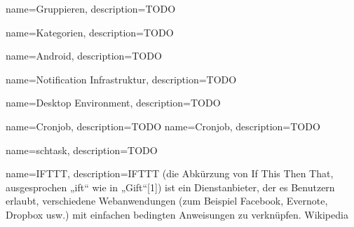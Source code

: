 {
  name=Gruppieren,
  description={TODO}
} 

{
  name=Kategorien,
  description={TODO }
} 

{
  name=Android,
  description={TODO}
} 

{
  name=Notification Infrastruktur,
  description={TODO}
} 

{
  name=Desktop Environment,
  description={TODO}
} 

{
  name=Cronjob,
  description={TODO}
} 
{
  name=Cronjob,
  description={TODO}
} 

{
  name=schtask,
  description={TODO}
} 

{
  name=IFTTT,
  description={IFTTT (die Abkürzung von If This Then That, ausgesprochen „ift“ wie in „Gift“[1]) ist ein Dienstanbieter, der es Benutzern erlaubt, verschiedene Webanwendungen (zum Beispiel Facebook, Evernote, Dropbox usw.) mit einfachen bedingten Anweisungen zu verknüpfen. Wikipedia}
} 





